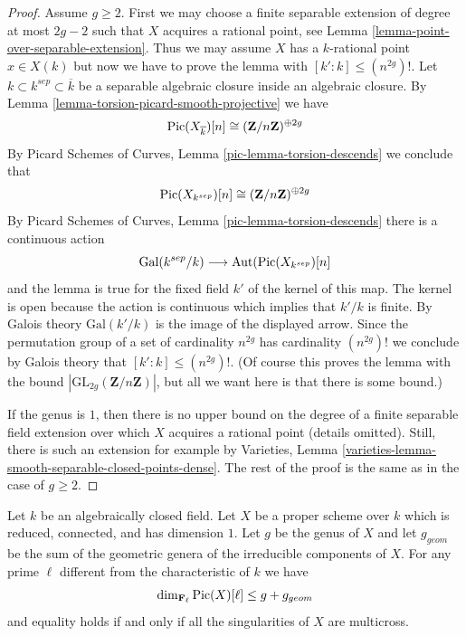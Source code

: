 \begin{proof}
Assume $g \geq 2$. First we may choose a finite separable extension
of degree at most $2g - 2$ such that $X$ acquires a rational point, see
Lemma \ref{lemma-point-over-separable-extension}.
Thus we may assume $X$ has a $k$-rational point $x \in X(k)$
but now we have to prove the lemma with
$[k' : k] \leq (n^{2g})!$.
Let $k \subset k^{sep} \subset \overline{k}$ be a separable algebraic
closure inside an algebraic closure.
By Lemma \ref{lemma-torsion-picard-smooth-projective} we have
$$
\mathop{\mathrm{Pic}}\nolimits(X_{\overline{k}})[n] \cong (\mathbf{Z}/n\mathbf{Z})^{\oplus 2g}
$$
By Picard Schemes of Curves, Lemma \ref{pic-lemma-torsion-descends}
we conclude that
$$
\mathop{\mathrm{Pic}}\nolimits(X_{k^{sep}})[n] \cong (\mathbf{Z}/n\mathbf{Z})^{\oplus 2g}
$$
By Picard Schemes of Curves, Lemma \ref{pic-lemma-torsion-descends}
there is a continuous action
$$
\text{Gal}(k^{sep}/k)
\longrightarrow
\text{Aut}(\mathop{\mathrm{Pic}}\nolimits(X_{k^{sep}})[n]
$$
and the lemma is true for the fixed field $k'$ of the kernel of this map.
The kernel is open because the action is continuous which implies
that $k'/k$ is finite. By Galois theory $\text{Gal}(k'/k)$
is the image of the displayed arrow. Since the permutation
group of a set of cardinality $n^{2g}$ has cardinality $(n^{2g})!$
we conclude by Galois theory that $[k' : k] \leq (n^{2g})!$.
(Of course this proves the lemma with the bound
$|\text{GL}_{2g}(\mathbf{Z}/n\mathbf{Z})|$, but all we want
here is that there is some bound.)

\medskip\noindent
If the genus is $1$, then there is no upper bound on the degree of a
finite separable field extension over which $X$ acquires a rational point
(details omitted). Still, there is such an extension for example by
Varieties, Lemma \ref{varieties-lemma-smooth-separable-closed-points-dense}.
The rest of the proof is the same as in the case of $g \geq 2$.
\end{proof}

\begin{proposition}
\label{proposition-torsion-picard-reduced-proper}
Let $k$ be an algebraically closed field. Let $X$ be a proper scheme over $k$
which is reduced, connected, and has dimension $1$. Let $g$ be the genus
of $X$ and let $g_{geom}$ be the sum of the geometric genera of the
irreducible components of $X$. For any prime $\ell$ different from
the characteristic of $k$ we have
$$
\dim_{\mathbf{F}_\ell} \mathop{\mathrm{Pic}}\nolimits(X)[\ell]
\leq g + g_{geom}
$$
and equality holds if and only if all the singularities of $X$
are multicross.
\end{proposition}

